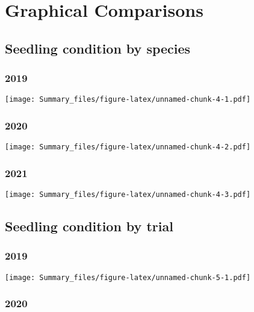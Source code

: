 \documentclass[
]{article}
\begin{document}
\hypertarget{graphical-comparisons}{%
\section{Graphical Comparisons}\label{graphical-comparisons}}

\hypertarget{seedling-condition-by-species}{%
\subsection{Seedling condition by
species}\label{seedling-condition-by-species}}

\hypertarget{section}{%
\subsubsection{2019}\label{section}}

\texttt{[image: Summary\_files/figure-latex/unnamed-chunk-4-1.pdf]}

\hypertarget{section-1}{%
\subsubsection{2020}\label{section-1}}

\texttt{[image: Summary\_files/figure-latex/unnamed-chunk-4-2.pdf]}

\hypertarget{section-2}{%
\subsubsection{2021}\label{section-2}}

\texttt{[image: Summary\_files/figure-latex/unnamed-chunk-4-3.pdf]}

\hypertarget{seedling-condition-by-trial}{%
\subsection{Seedling condition by
trial}\label{seedling-condition-by-trial}}

\hypertarget{section-3}{%
\subsubsection{2019}\label{section-3}}

\texttt{[image: Summary\_files/figure-latex/unnamed-chunk-5-1.pdf]}

\hypertarget{section-4}{%
\subsubsection{2020}\label{section-4}}
\end{document}
